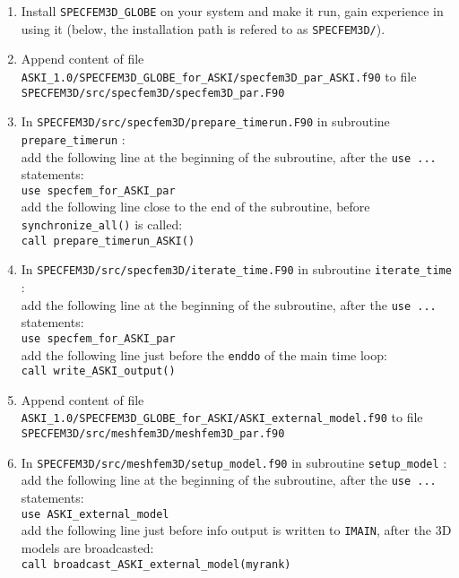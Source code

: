 \documentclass[12pt,a4paper]{article}
\newcommand{\lcode}[1]{\nolinkurl{#1}}
\begin{document}
\begin{enumerate}
\item Install \lcode{SPECFEM3D_GLOBE} on your system and make it run, gain 
   experience in using it (below, the installation path is refered to as 
   \lcode{SPECFEM3D/}).

 \item Append content of file \lcode{ASKI_1.0/SPECFEM3D_GLOBE_for_ASKI/specfem3D_par_ASKI.f90} to file
   \lcode{SPECFEM3D/src/specfem3D/specfem3D_par.F90}

 \item In \lcode{SPECFEM3D/src/specfem3D/prepare_timerun.F90} in subroutine \lcode{prepare_timerun} :\\
   add the following line at the beginning of the subroutine, after the \lcode{use ...} statements:\\
   \lcode{use specfem_for_ASKI_par}\\
   add the following line close to the end of the subroutine, before \lcode{synchronize_all()} is called:\\
   \lcode{call prepare_timerun_ASKI()}

 \item In \lcode{SPECFEM3D/src/specfem3D/iterate_time.F90} in subroutine \lcode{iterate_time} :\\
   add the following line at the beginning of the subroutine, after the \lcode{use ...} statements:\\
   \lcode{use specfem_for_ASKI_par}\\
   add the following line just before the \lcode{enddo} of the main time loop:\\
   \lcode{call write_ASKI_output()}

 \item Append content of file \lcode{ASKI_1.0/SPECFEM3D_GLOBE_for_ASKI/ASKI_external_model.f90} to file
   \lcode{SPECFEM3D/src/meshfem3D/meshfem3D_par.f90}

 \item In \lcode{SPECFEM3D/src/meshfem3D/setup_model.f90} in subroutine \lcode{setup_model} : \\
   add the following line at the beginning of the subroutine, after the \lcode{use ...} statements:\\
   \lcode{use ASKI_external_model}\\
   add the following line just before info output is written to \lcode{IMAIN}, after the 3D models are broadcasted:\\
   \lcode{call broadcast_ASKI_external_model(myrank)}


\end{enumerate}
\end{document}
